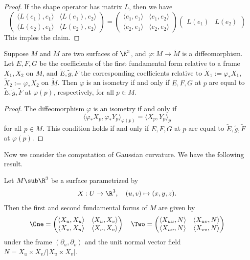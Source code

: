 \begin{proof}
If the shape operator has matrix $L$, then we have
\[\begin{pmatrix}
\langle L(e_1),e_1\rangle&\langle L(e_1),e_2\rangle\\
\langle L(e_2),e_1\rangle&\langle L(e_2),e_2\rangle
\end{pmatrix}=\begin{pmatrix}
\langle e_1,e_1\rangle&\langle e_1,e_2\rangle\\
\langle e_2,e_1\rangle&\langle e_2,e_2\rangle
\end{pmatrix}\begin{pmatrix}
L(e_1)&L(e_2)
\end{pmatrix}\]
This imples the claim.
\end{proof}
\begin{theorem}
Suppose $M$ and $\widetilde{M}$ are two surfaces of $\R^3$, and $\varphi:M\to\widetilde{M}$ is a diffeomorphism. Let $E,F,G$ be the coefficients of the first fundamental form relative to a frame $X_1,X_2$ on $M$, and $\widetilde{E},\tilde{g},\widetilde{F}$ the corresponding coefficients relative to 
$\widetilde{X}_1:=\varphi_*X_1$, $\widetilde{X}_2:=\varphi_*X_2$ on $\widetilde{M}$. Then $\varphi$ is an isometry if and only if $E,F,G$ at $p$ are equal to $\widetilde{E},\tilde{g},\widetilde{F}$ at $\varphi(p)$, respectively, for all $p\in M$.
\end{theorem}
\begin{proof}
The diffeomorphism $\varphi$ is an isometry if and only if
\[\langle\varphi_*X_p,\varphi_*Y_p\rangle_{\varphi(p)}=\langle X_p,Y_p\rangle_p\]
for all $p\in M$. This condition holds if and only if $E,F,G$ at $p$ are equal to $\widetilde{E},\tilde{g},\widetilde{F}$ at $\varphi(p)$.
\end{proof}
Now we consider the computation of Gaussian curvature. We have the following result.
\begin{proposition}\label{Riemann parametrized surface Guassian curvature}
Let $M\sub\R^3$ be a surface parametrized by 
\[X:U\to\R^3,\quad (u,v)\mapsto(x,y,z).\]
Then the first and second fundamental forms of $M$ are given by
\[\One=\begin{pmatrix}
\langle X_u,X_u\rangle&\langle X_u,X_v\rangle\\
\langle X_v,X_u\rangle&\langle X_v,X_v\rangle
\end{pmatrix}\quad\Two=\begin{pmatrix}
\langle X_{uu},N\rangle&\langle X_{uv},N\rangle\\
\langle X_{uv},N\rangle&\langle X_{vv},N\rangle
\end{pmatrix}\]
under the frame $(\partial_u,\partial_v)$ and the unit normal vector field $N=X_u\times X_v/|X_u\times X_v|$.
\end{proposition}

